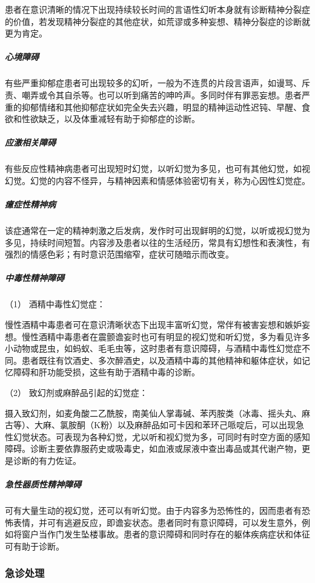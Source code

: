 患者在意识清晰的情况下出现持续较长时间的言语性幻听本身就有诊断精神分裂症的价值，若发现精神分裂症的其他症状，如荒谬或多种妄想、精神分裂症的诊断就更为肯定。

\subparagraph{心境障碍}

有些严重抑郁症患者可出现较多的幻听，一般为不连贯的片段言语声，如谩骂、斥责、嘲弄或令其自杀等。也可以听到痛苦的呻吟声。多同时伴有罪恶妄想。患者严重的抑郁情绪和其他抑郁症状如完全失去兴趣，明显的精神运动性迟钝、早醒、食欲和性欲缺乏，以及体重减轻有助于抑郁症的诊断。

\subparagraph{应激相关障碍}

有些反应性精神病患者可出现短时幻觉，以听幻觉为多见，也可有其他幻觉，如视幻觉。幻觉的内容不怪异，与精神因素和情感体验密切有关，称为心因性幻觉症。

\subparagraph{癔症性精神病}

该症通常在一定的精神刺激之后发病，发作时可出现鲜明的幻觉，以听或视幻觉为多见，持续时间短暂。内容涉及患者以往的生活经历，常具有幻想性和表演性，有强烈的情感色彩；有时意识范围缩窄，症状可随暗示而改变。

\subparagraph{中毒性精神障碍}

\hypertarget{text00048.htmlux5cux23CHP1-18-6-2-5-1}{}
（1） 酒精中毒性幻觉症：

慢性酒精中毒患者可在意识清晰状态下出现丰富听幻觉，常伴有被害妄想和嫉妒妄想。慢性酒精中毒患者在震颤谵妄时也可有明显的视幻觉和听幻觉，多为看见许多小动物或昆虫，如蚂蚁、毛毛虫等，这时患者有意识障碍，与酒精中毒性幻觉症不同。患者既往有饮酒史、多次醉酒史，以及酒精中毒的其他精神和躯体症状，如记忆障碍和肝功能受损，这些有助于酒精中毒的诊断。

\hypertarget{text00048.htmlux5cux23CHP1-18-6-2-5-2}{}
（2） 致幻剂或麻醉品引起的幻觉症：

摄入致幻剂，如麦角酸二乙酰胺，南美仙人掌毒碱、苯丙胺类（冰毒、摇头丸、麻古等）、大麻、氯胺酮（K粉）以及麻醉品如可卡因和苯环己哌啶后，可以出现急性幻觉状态。可表现为各种幻觉，尤以听和视幻觉为多，可同时有时空方面的感知障碍。诊断主要依靠服药史或吸毒史，如血液或尿液中查出毒品或其代谢产物，更是诊断的有力佐证。

\subparagraph{急性器质性精神障碍}

可有大量生动的视幻觉，还可以有听幻觉。由于内容多为恐怖性的，因而患者有恐怖表情，并可有逃避反应，即谵妄状态。患者同时有意识障碍，可以发生意外，例如将窗户当作门发生坠楼事故。患者的意识障碍和同时存在的躯体疾病症状和体征可有助于诊断。

\subsubsection{急诊处理}

